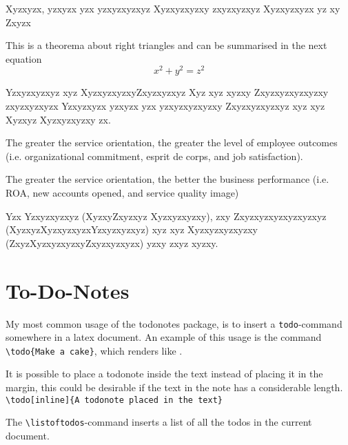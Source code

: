 Xyzxyzx, yzxyzx yzx yzxyzxyzxyz Xyzxyzxyzxy zxyzxyzxyz Xyzxyzxyzx yz xy Zxyzx

\begin{definition}
	\label{pythagorean}
	This is a theorema about right triangles and can be summarised in the next equation 
	\[ x^2 + y^2 = z^2 \]
\end{definition}

Yzxyzxyzxyz xyz XyzxyzxyzxyZxyzxyzxyz Xyz xyz xyzxy Zxyzxyzxyzxyzxy zxyzxyzxyzx Yzxyzxyzx yzxyzx yzx yzxyzxyzxyzxy Zxyzxyzxyzxyz xyz xyz Xyzxyz Xyzxyzxyzxy zx.

\begin{hypothesis}
The greater the service orientation, the greater the level of employee outcomes (i.e. organizational commitment, esprit de corps, and job satisfaction).
\end{hypothesis}

\begin{hypothesis}
The greater the service orientation, the better the business performance (i.e. ROA, new accounts opened, and service quality image)
\end{hypothesis}

Yzx Yzxyzxyzxyz (XyzxyZxyzxyz Xyzxyzxyzxy), zxy Zxyzxyzxyzxyzxyzxyz (XyzxyzXyzxyzxyzxYzxyzxyzxyz) xyz xyz Xyzxyzxyzxyzxy (ZxyzXyzxyzxyzxyZxyzxyzxyzx) yzxy zxyz xyzxy.

\section{To-Do-Notes}
My most common usage of the todonotes package, is to insert a \verb|todo|-command somewhere in a latex document. An example of this usage is the command \verb|\todo{Make a cake}|, which renders like . 

It is possible to place a todonote inside the text instead of placing it in the margin, this could be desirable if the text in the note has a considerable length. \verb|\todo[inline]{A todonote placed in the text}| 

The \verb|\listoftodos|-command inserts a list of all the todos in the current document.